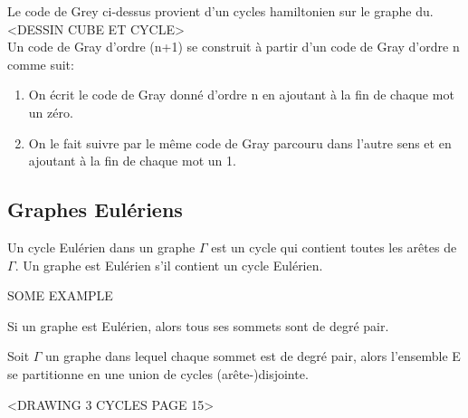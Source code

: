 \begin{exmp}
\end{exmp}



Le code de Grey ci-dessus provient d'un cycles hamiltonien sur le graphe du.\\

<DESSIN CUBE ET CYCLE>\\

Un code de Gray d'ordre (n+1) se construit à partir d'un code de Gray d'ordre n comme suit:

\begin{enumerate}
	\item On écrit le code de Gray donné d'ordre n en ajoutant à la fin de chaque mot un zéro.
	\item On le fait suivre par le même code de Gray parcouru dans l'autre sens et en ajoutant à la fin de chaque mot un 1.
\end{enumerate}


\subsection{Graphes Eulériens}

\begin{defn}
Un cycle Eulérien dans un graphe $\Gamma$ est un cycle qui contient toutes les arêtes de $\Gamma$.
Un graphe est Eulérien s'il contient un cycle Eulérien.\\
\end{defn}

\begin{exmp}
SOME EXAMPLE\\
\end{exmp}

\begin{prop}
Si un graphe est Eulérien, alors tous ses sommets sont de degré pair.\\
\end{prop}

\begin{lemme}
Soit $\Gamma$ un graphe dans lequel chaque sommet est de degré pair, alors l'ensemble E se partitionne en une union de cycles (arête-)disjointe.\\
\end{lemme}

\begin{exmp}
<DRAWING 3 CYCLES PAGE 15>\\
\end{exmp}

